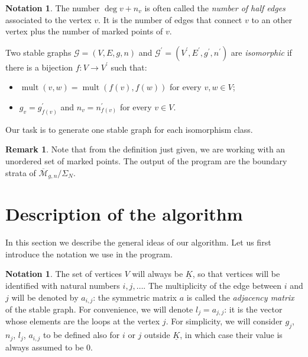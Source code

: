 \documentclass{amsart}
\theoremstyle{plain}
\theoremstyle{definition}
\newtheorem{remark}[theorem]{Remark}
\newtheorem{notation}[theorem]{Notation}
\DeclareMathOperator{\mult}{mult}
\newcommand{\graph}{\mathcal{G}}
\newcommand{\ubar}[1]{\underline{#1}}
\begin{document}
\begin{notation}
  The number $\deg v + n_v$ is often called the \emph{number of half edges}
  associated to the vertex $v$. It is the number of edges that connect $v$ 
  to an other vertex plus the number of marked points of $v$. 
\end{notation}

Two stable graphs $\graph = (V, E, g, n)$ and $\graph^\prime =
(V^\prime, E^\prime, g^\prime, n^\prime)$ are \emph{isomorphic\/} if
there is a bijection $f\colon V \to V^\prime$ such that:
\begin{itemize}
\item $\mult(v, w) = \mult(f(v), f(w))$ for every $v, w \in V$;
\item $g_v = g^\prime_{f(v)}$ and $n_v = n^\prime_{f(v)}$ for every $v
  \in V$.
\end{itemize}
Our task is to generate one stable graph for each isomorphism class.

\begin{remark}
  Note that from the definition just given, we are working with an
  unordered set of marked points. The output of the program are the
  boundary strata of $\overline{\mathcal{M}}_{g,n}/\Sigma_N$.
\end{remark}



\section{Description of the algorithm}\label{sec:description}

In this section we describe the general ideas of our algorithm. Let us
first introduce the notation we use in the program.

\begin{notation}\label{not:gnla}
  The set of vertices $V$ will always be $\ubar{K}$, so that vertices
  will be identified with natural numbers $i, j, \dots$. The
  multiplicity of the edge between $i$ and $j$ will be denoted by
  $a_{i,j}$: the symmetric matrix $a$ is called the \emph{adjacency
    matrix} of the stable graph. For convenience, we will denote $l_j
  = a_{j,j}$: it is the vector whose elements are the loops at the
  vertex $j$. For simplicity, we will consider $g_j$, $n_j$, $l_j$,
  $a_{i,j}$ to be defined also for $i$ or $j$ outside $\ubar{K}$, in
  which case their value is always assumed to be $0$.
\end{notation}
\end{document}
